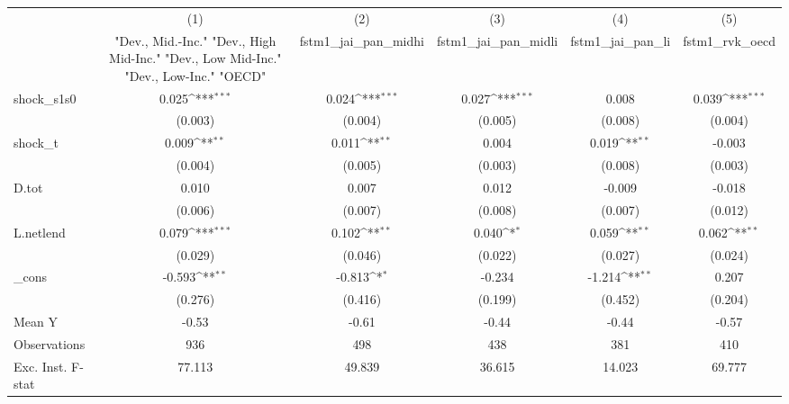 {
\def\sym#1{\ifmmode^{#1}\else\(^{#1}\)\fi}
\begin{tabular}{l*{5}{c}}
\toprule
            &\multicolumn{1}{c}{(1)}&\multicolumn{1}{c}{(2)}&\multicolumn{1}{c}{(3)}&\multicolumn{1}{c}{(4)}&\multicolumn{1}{c}{(5)}\\
            &\multicolumn{1}{c}{ "Dev., Mid.-Inc." "Dev., High Mid-Inc." "Dev., Low Mid-Inc." "Dev., Low-Inc." "OECD" }&\multicolumn{1}{c}{fstm1\_jai\_pan\_midhi}&\multicolumn{1}{c}{fstm1\_jai\_pan\_midli}&\multicolumn{1}{c}{fstm1\_jai\_pan\_li}&\multicolumn{1}{c}{fstm1\_rvk\_oecd}\\
\midrule
shock\_s1s0  &       0.025\sym{***}&       0.024\sym{***}&       0.027\sym{***}&       0.008         &       0.039\sym{***}\\
            &     (0.003)         &     (0.004)         &     (0.005)         &     (0.008)         &     (0.004)         \\
\addlinespace
shock\_t     &       0.009\sym{**} &       0.011\sym{**} &       0.004         &       0.019\sym{**} &      -0.003         \\
            &     (0.004)         &     (0.005)         &     (0.003)         &     (0.008)         &     (0.003)         \\
\addlinespace
D.tot       &       0.010         &       0.007         &       0.012         &      -0.009         &      -0.018         \\
            &     (0.006)         &     (0.007)         &     (0.008)         &     (0.007)         &     (0.012)         \\
\addlinespace
L.netlend   &       0.079\sym{***}&       0.102\sym{**} &       0.040\sym{*}  &       0.059\sym{**} &       0.062\sym{**} \\
            &     (0.029)         &     (0.046)         &     (0.022)         &     (0.027)         &     (0.024)         \\
\addlinespace
\_cons      &      -0.593\sym{**} &      -0.813\sym{*}  &      -0.234         &      -1.214\sym{**} &       0.207         \\
            &     (0.276)         &     (0.416)         &     (0.199)         &     (0.452)         &     (0.204)         \\
\midrule
Mean Y      &       -0.53         &       -0.61         &       -0.44         &       -0.44         &       -0.57         \\
Observations&         936         &         498         &         438         &         381         &         410         \\
Exc. Inst. F-stat&      77.113         &      49.839         &      36.615         &      14.023         &      69.777         \\
\bottomrule
\end{tabular}
}
